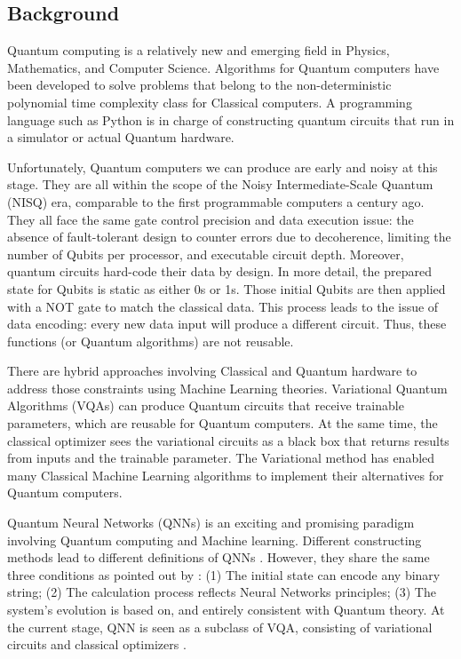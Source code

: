 \subsection{Background}\label{Background Section}
Quantum computing is a relatively new and emerging field in Physics, Mathematics, and Computer Science. 
Algorithms for Quantum computers have been developed to solve problems that belong to the non-deterministic polynomial time complexity class for Classical computers. 
A programming language such as Python is in charge of constructing quantum circuits that run in a simulator or actual Quantum hardware. 

Unfortunately, Quantum computers we can produce are early and noisy at this stage. 
They are all within the scope of the Noisy Intermediate-Scale Quantum (NISQ) era, comparable to the first programmable computers a century ago. 
They all face the same gate control precision and data execution issue: the absence of fault-tolerant design to counter errors due to decoherence, limiting the number of Qubits per processor, and executable circuit depth. 
Moreover, quantum circuits hard-code their data by design. In more detail, the prepared state for Qubits is static as either 0s or 1s. 
Those initial Qubits are then applied with a NOT gate to match the classical data. This process leads to the issue of data encoding: every new data input will produce a different circuit. 
Thus, these functions (or Quantum algorithms) are not reusable.

There are hybrid approaches involving Classical and Quantum hardware to address those constraints using Machine Learning theories. 
Variational Quantum Algorithms (VQAs) can produce Quantum circuits that receive trainable parameters, which are reusable for Quantum computers. 
At the same time, the classical optimizer sees the variational circuits as a black box that returns results from inputs and the trainable parameter. 
The Variational method has enabled many Classical Machine Learning algorithms to implement their alternatives for Quantum computers.

Quantum Neural Networks (QNNs) \cite{altaisky2001quantum} is an exciting and promising paradigm involving Quantum computing and Machine learning. 
Different constructing methods lead to different definitions of QNNs \cite{paetznick2013} \cite{zhaoBuildingQuantumNeural2019} \cite{caoQuantumNeuronElementary2017}. 
However, they share the same three conditions as pointed out by \cite{schuldQuestQuantumNeural2014}: 
(1) The initial state can encode any binary string;
(2) The calculation process reflects Neural Networks principles;
(3) The system's evolution is based on, and entirely consistent with Quantum theory.
At the current stage, QNN is seen as a subclass of VQA, consisting of variational circuits and classical optimizers \cite{abbasPowerQuantumNeural2021}.

